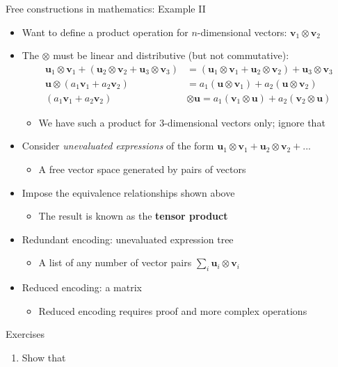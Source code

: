 \documentclass[english,,russian]{beamer}
\begin{document}
\begin{frame}{Free constructions in mathematics: Example II}
\begin{itemize}
\item Want to define a product operation for $n$-dimensional vectors: $\mathbf{v}_{1}\otimes\mathbf{v}_{2}$
\item The $\otimes$ must be linear and distributive (but not commutative):
\begin{align*}
\mathbf{u}_{1}\otimes\mathbf{v}_{1}+\left(\mathbf{u}_{2}\otimes\mathbf{v}_{2}+\mathbf{u}_{3}\otimes\mathbf{v}_{3}\right) & =\left(\mathbf{u}_{1}\otimes\mathbf{v}_{1}+\mathbf{u}_{2}\otimes\mathbf{v}_{2}\right)+\mathbf{u}_{3}\otimes\mathbf{v}_{3}\\
\mathbf{u}\otimes\left(a_{1}\mathbf{v}_{1}+a_{2}\mathbf{v}_{2}\right) & =a_{1}\left(\mathbf{u}\otimes\mathbf{v}_{1}\right)+a_{2}\left(\mathbf{u}\otimes\mathbf{v}_{2}\right)\\
\left(a_{1}\mathbf{v}_{1}+a_{2}\mathbf{v}_{2}\right) & \otimes\mathbf{u}=a_{1}\left(\mathbf{v}_{1}\otimes\mathbf{u}\right)+a_{2}\left(\mathbf{v}_{2}\otimes\mathbf{u}\right)
\end{align*}

\begin{itemize}
\item We have such a product for 3-dimensional vectors only; ignore that
\end{itemize}
\item Consider \emph{unevaluated} \emph{expressions} of the form $\mathbf{u}_{1}\otimes\mathbf{v}_{1}+\mathbf{u}_{2}\otimes\mathbf{v}_{2}+...$
\begin{itemize}
\item A free vector space generated by pairs of vectors
\end{itemize}
\item Impose the equivalence relationships shown above
\begin{itemize}
\item The result is known as the \textbf{tensor product}
\end{itemize}
\item Redundant encoding: unevaluated expression tree
\begin{itemize}
\item A list of any number of vector pairs $\sum_{i}\mathbf{u}_{i}\otimes\mathbf{v}_{i}$
\end{itemize}
\item Reduced encoding: a matrix
\begin{itemize}
\item Reduced encoding requires proof and more complex operations
\end{itemize}
\end{itemize}
\end{frame}

\begin{frame}{Exercises}
\begin{enumerate}
\item {\footnotesize{}\vspace{-0.15cm}Show that }{\footnotesize\par}
\end{enumerate}
\end{frame}
\end{document}

